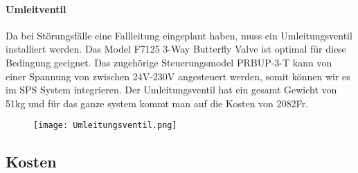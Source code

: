 
\paragraph{Umleitventil}


Da bei Störungsfälle eine Fallleitung eingeplant haben, muss ein Umleitungsventil installiert werden. Das Model F7125 3-Way Butterfly Valve ist optimal für diese Bedingung geeignet. Das zugehörige Steuerungsmodel PRBUP-3-T kann von einer Spannung von zwischen 24V-230V angesteuert werden, somit können wir es im SPS System integrieren. Der Umleitungsventil hat ein gesamt Gewicht von 51\si{kg} und für das ganze system kommt man auf die Kosten von 2082\si{Fr}.

 \begin{figure} [H]
	\centering
	\texttt{[image: Umleitungsventil.png]}
	\label{fig:Umleitungsventil}
\end{figure}


\cite{Belimo}
\subsection{Kosten}

